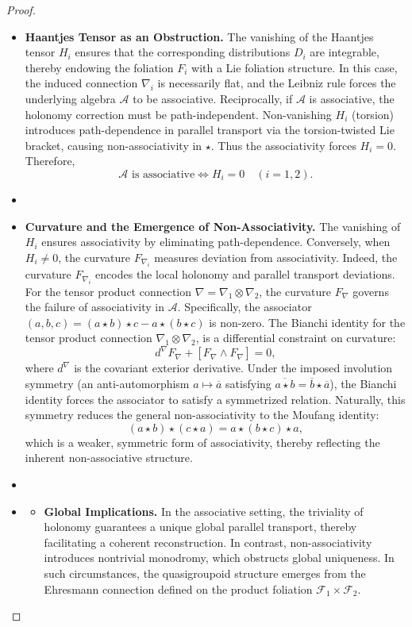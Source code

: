 \documentclass[10pt,a4paper]{amsart}
\begin{document}
\begin{proof}~
\begin{itemize}
\item[(1)] \textbf{Haantjes Tensor as an Obstruction.} The vanishing of the Haantjes tensor $H_i$	
ensures that the corresponding distributions $D_i$	
are integrable, thereby endowing the foliation 
$F_i$ with a Lie foliation structure. In this case, the induced connection $\nabla_i$	
 is necessarily flat, and the Leibniz rule forces the underlying algebra 
$\mathcal{A}$ to be associative. Reciprocally, if $\mathcal{A}$ is associative, the holonomy correction must be path-independent. Non-vanishing $H_i$ (torsion) introduces path-dependence in parallel transport via the torsion-twisted Lie bracket, causing non-associativity in $\star$. Thus the associativity forces $H_i=0$.
Therefore, \[\mathcal{A} \text{ is associative} \iff H_i = 0 \quad (i = 1, 2).\]
\item[]
\item[(2)] \textbf{Curvature and the Emergence of Non-Associativity.} The vanishing of $H_i$ ensures associativity by eliminating path-dependence. Conversely, when \(H_i \neq 0\), the curvature \(F_{\nabla_i}\) measures deviation from associativity. Indeed, the curvature  \(F_{\nabla_i}\) encodes the local holonomy and parallel transport deviations. For the tensor product connection  \(\nabla=\nabla_1 \otimes \nabla_2\), the curvature \(F_{\nabla}\) governs the failure of associativity in $\mathcal{A}$. Specifically, the associator $(a,b,c)=(a\star b)\star c-a\star (b\star c) $ is non-zero. The Bianchi identity for the tensor product connection \(\nabla_1 \otimes \nabla_2\), is a differential constraint on curvature: \[d^{\nabla}F_{\nabla}+[F_{\nabla}\wedge F_{\nabla}]=0,\] where $d^{\nabla}$ is the covariant exterior derivative. Under the imposed involution symmetry (an anti-automorphism $a\mapsto \overline{a}$ satisfying $ \overline{a\star b}= \overline{b}\star \overline{a}$), the Bianchi identity forces the associator to satisfy a symmetrized relation. Naturally, this symmetry reduces the general non-associativity to the Moufang identity: \[(a\star b)\star (c\star a)=a\star (b\star c)\star a, \] which is a weaker, symmetric form of associativity, thereby reflecting the inherent non-associative structure.
\item[]
\item[(3)] \begin{itemize}
\item \textbf{Global Implications.} In the associative setting, the triviality of holonomy guarantees a unique global parallel transport, thereby facilitating a coherent reconstruction. In contrast, non-associativity introduces nontrivial monodromy, which obstructs global uniqueness. In such circumstances, the quasigroupoid structure emerges from the Ehresmann connection defined on the product foliation \(\mathcal{F}_1 \times \mathcal{F}_2\).


\end{itemize}
\end{itemize}
\end{proof}
\end{document}

